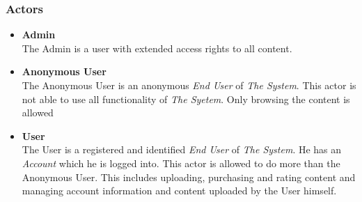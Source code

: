 %

\subsubsection{Actors}
\label{sec:Actors}
\begin{itemize}
\item \textbf{Admin} \\
The Admin is a user with extended access rights to all content. 
\item \textbf{Anonymous User}\\ 
The Anonymous User is an anonymous \textit{End User} of \textit{The System}. This actor is not able to use all functionality of \textit{The Syetem}. Only browsing the content is allowed
\item \textbf{User} \\
The User is a registered and identified \textit{End User} of \textit{The System}. He has an \textit{Account} which he is logged into. This actor is allowed to do more than the Anonymous User. This includes uploading, purchasing and rating content and managing account information and content uploaded by the User himself.
\end{itemize}

